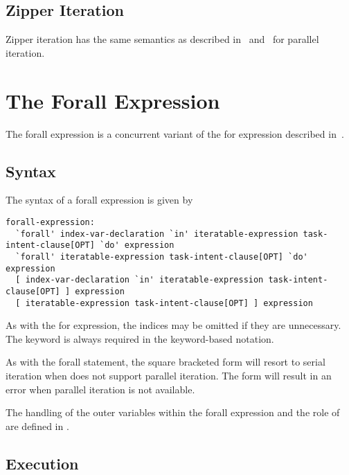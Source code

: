\subsection{Zipper Iteration}
\label{forall_zipper}

Zipper iteration has the same semantics as described
in~ and~ for parallel
iteration.

\pagebreak
\section{The Forall Expression}
\label{Forall_Expressions}

The forall expression is a concurrent variant of the for expression
described in~.

\subsection{Syntax}
\label{forall_expr_syntax}

The syntax of a forall expression is given by
\begin{syntax}
\begin{verbatim}
forall-expression:
  `forall' index-var-declaration `in' iteratable-expression task-intent-clause[OPT] `do' expression
  `forall' iteratable-expression task-intent-clause[OPT] `do' expression
  [ index-var-declaration `in' iteratable-expression task-intent-clause[OPT] ] expression
  [ iteratable-expression task-intent-clause[OPT] ] expression
\end{verbatim}
\end{syntax}
As with the for expression, the indices may be omitted if they are
unnecessary.  The  keyword is always required in the
keyword-based notation.

As with the forall statement, the square bracketed
form will resort to serial iteration when 
does not support parallel iteration.  The  form will
result in an error when parallel iteration is not available.

The handling of the outer variables within the forall expression and
the role of  are defined in .

\subsection{Execution}
\label{Forall_Expression_Execution}

